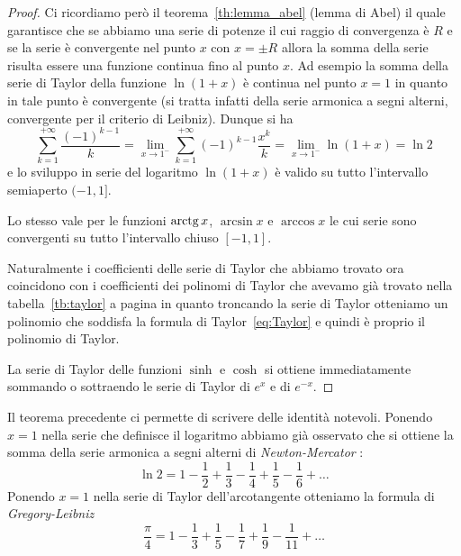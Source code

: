 \begin{proof}
  Ci ricordiamo però il teorema~\ref{th:lemma_abel} (lemma di Abel) il quale 
  garantisce che se abbiamo una serie di potenze il cui raggio di convergenza 
  è $R$ e se la serie è convergente nel punto $x$ con $x=\pm R$ allora 
  la somma della serie risulta essere una funzione continua fino al punto $x$.
  Ad esempio la somma della serie di Taylor della funzione $\ln(1+x)$
  è continua nel punto $x=1$ in quanto in tale punto è convergente 
  (si tratta infatti della serie armonica a segni alterni, 
  convergente per il criterio di Leibniz). 
  Dunque si ha 
  \begin{equation}\label{eq:somma_serie_leibniz}
    \sum_{k=1}^{+\infty} \frac{(-1)^{k-1}} k 
    = \lim_{x\to 1^-} \sum_{k=1}^{+\infty} (-1)^{k-1} \frac{x^k}{k}
    = \lim_{x\to 1^-} \ln (1+x) = \ln 2 
  \end{equation}
  e lo sviluppo in serie del logaritmo $\ln(1+x)$ è valido su 
  tutto l'intervallo semiaperto $(-1,1]$. 

  Lo stesso vale per le funzioni $\operatorname{arctg} x$, $\arcsin x$ e $\arccos x$ le cui serie 
  sono convergenti su tutto l'intervallo chiuso $[-1,1]$.

  Naturalmente i coefficienti delle serie di Taylor che abbiamo trovato ora
  coincidono con i coefficienti 
  dei polinomi di Taylor che avevamo già trovato nella tabella~\ref{tb:taylor}
  a pagina \pageref{tb:taylor} in quanto troncando la serie di Taylor otteniamo 
  un polinomio che soddisfa la formula di Taylor~\eqref{eq:Taylor} 
  e quindi è proprio il polinomio di Taylor.

  La serie di Taylor delle funzioni $\sinh$ e $\cosh$ si ottiene immediatamente 
  sommando o sottraendo le serie di Taylor di $e^x$ e di $e^{-x}$.
\end{proof}

Il teorema precedente ci permette di scrivere delle identità notevoli. 
Ponendo $x=1$ nella serie che definisce il logaritmo abbiamo già osservato 
che si ottiene la somma della serie armonica a segni alterni di \emph{Newton-Mercator}%
%
:
%
%
%
%
\begin{equation}\label{eq:serie_ln2}
  \ln 2 = 1 - \frac 1 2 + \frac 1 3 - \frac 1 4 + \frac 1 5 - \frac 1 6 + \dots
\end{equation}
Ponendo $x=1$ nella serie di Taylor dell'arcotangente otteniamo 
la formula di \emph{Gregory-Leibniz}%
%
%
%
%
%
\[
  \frac \pi 4 =
   1 - \frac 1 3 + \frac 1 5 - \frac 1 7 + \frac 1 9 - \frac 1 {11} + \dots
\]

